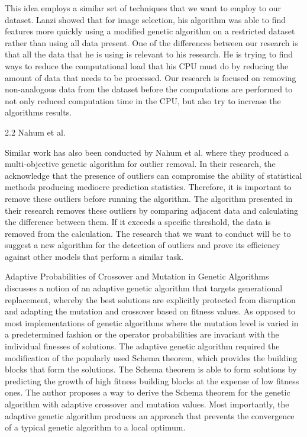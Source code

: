 \documentclass[conference]{IEEEtran}
\begin{document}
\large This idea employs a similar set of techniques that we want to employ to our dataset. Lanzi showed that for image selection, his algorithm was able to find features more quickly using a modified genetic algorithm on a restricted dataset rather than using all data present. One of the differences between our research is that all the data that he is using is relevant to his research. He is trying to find ways to reduce the computational load that his CPU must do by reducing the amount of data that needs to be processed. Our research is focused on removing non-analogous data from the dataset before the computations are performed to not only reduced computation time in the CPU, but also try to increase the algorithms results. 

2.2 Nahum et al.

\large Similar work has also been conducted by Nahum et al.  where they produced a multi-objective genetic algorithm for outlier removal. In their research, the acknowledge that the presence of outliers can compromise the ability of statistical methods producing mediocre prediction statistics. Therefore, it is important to remove these outliers before running the algorithm. The algorithm presented in their research removes these outliers by comparing adjacent data and calculating the difference between them. If it exceeds a specific threshold, the data is removed from the calculation. The research that we want to conduct will be to suggest a new algorithm for the detection of outliers and prove its efficiency against other models that perform a similar task. 

\large Adaptive Probabilities of Crossover and Mutation in Genetic Algorithms discusses a notion of an adaptive genetic algorithm that targets generational replacement, whereby the best solutions are explicitly protected from disruption and adapting the mutation and crossover based on fitness values. As opposed to most implementations of genetic algorithms where the mutation level is varied in a predetermined fashion or the operator probabilities are invariant with the individual finesses of solutions. The adaptive genetic algorithm required the modification of the popularly used Schema theorem, which provides the building blocks that form the solutions. The Schema theorem is able to form solutions by predicting the growth of high fitness building blocks at the expense of low fitness ones. The author proposes a way to derive the Schema theorem for the genetic algorithm with adaptive crossover and mutation values. Most importantly, the adaptive genetic algorithm produces an approach that prevents the convergence of a typical genetic algorithm to a local optimum.
\end{document}
